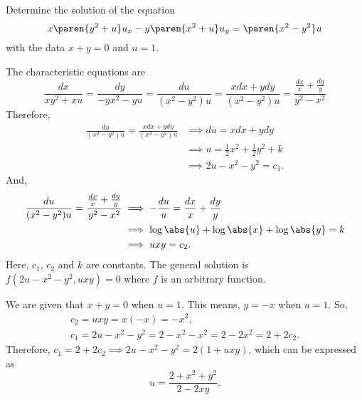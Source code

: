 \documentclass[11pt]{penrose}
\begin{document}
\begin{problem}{2}
\end{problem}

\begin{problem}{3}
    Determine the solution of the equation
    \begin{equation*}
        x \paren{y^2 + u} u_x - y \paren{x^2 + u} u_y = \paren{x^2 - y^2} u
    \end{equation*}
    with the data $x + y = 0$ and $u = 1$.

    \solution The characteristic equations are
    \begin{equation*}
        \frac{dx}{xy^2 + xu}
        = \frac{dy}{-yx^2 - yu}
        = \frac{du}{(x^2 - y^2)u}
        = \frac{xdx+ydy}{(x^2 - y^2)u}
        = \frac{\frac{dx}{x}+\frac{dy}{y}}{y^2 - x^2}
    \end{equation*}
    Therefore,
    \begin{align*}
        \frac{du}{(x^2 - y^2)u} = \frac{xdx+ydy}{(x^2 - y^2)u}
        &\implies
        du = xdx+ydy\\
        &\implies
        u = \frac{1}{2}x^2 + \frac{1}{2}y^2 + k\\
        &\implies
        2u - x^2 - y^2 = c_1.
    \end{align*}
    And,
    \begin{align*}
        \frac{du}{(x^2 - y^2)u} = \frac{\frac{dx}{x}+\frac{dy}{y}}{y^2 - x^2}
        &\implies
        -\frac{du}{u} = \frac{dx}{x} + \frac{dy}{y}\\
        &\implies
        \log\abs{u} + \log\abs{x} + \log\abs{y} = k\\
        &\implies
        uxy = c_2.
    \end{align*}
    Here, $c_1$, $c_2$ and $k$ are constants. The general solution is $f(2u - x^2 - y^2, uxy) = 0$ where $f$ is an arbitrary function.

    We are given that $x+y = 0$ when $u=1$. This means, $y = -x$ when $u=1$. So,
    \begin{gather*}
        c_2 = uxy = x(-x) = -x^2,\\
        c_1 = 2u - x^2 - y^2 = 2 - x^2 - x^2 = 2 - 2x^2 = 2 + 2c_2.
    \end{gather*}
    Therefore, $c_1 = 2 + 2c_2 \implies 2u - x^2 - y^2 = 2(1 + uxy)$, which can be expressed as
    \begin{equation*}
        u = \frac{2+x^2+y^2}{2-2xy}.
    \end{equation*}
\end{problem}
\end{document}
